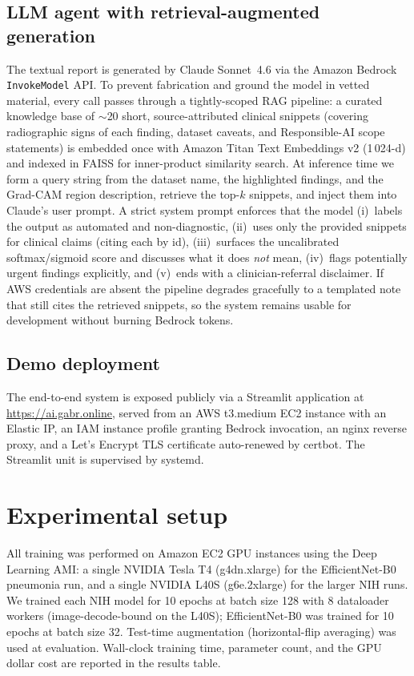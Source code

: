 \documentclass[10pt,journal,onecolumn]{IEEEtran}
\begin{document}
\subsection{LLM agent with retrieval-augmented generation}
The textual report is generated by Claude Sonnet~4.6 via the Amazon Bedrock \texttt{InvokeModel} API. To prevent fabrication and ground the model in vetted material, every call passes through a tightly-scoped RAG pipeline: a curated knowledge base of $\sim$20 short, source-attributed clinical snippets (covering radiographic signs of each finding, dataset caveats, and Responsible-AI scope statements) is embedded once with Amazon Titan Text Embeddings v2 (1\,024-d) and indexed in FAISS for inner-product similarity search. At inference time we form a query string from the dataset name, the highlighted findings, and the Grad-CAM region description, retrieve the top-$k$ snippets, and inject them into Claude's user prompt. A strict system prompt enforces that the model (i)~labels the output as automated and non-diagnostic, (ii)~uses only the provided snippets for clinical claims (citing each by id), (iii)~surfaces the uncalibrated softmax/sigmoid score and discusses what it does \emph{not} mean, (iv)~flags potentially urgent findings explicitly, and (v)~ends with a clinician-referral disclaimer. If AWS credentials are absent the pipeline degrades gracefully to a templated note that still cites the retrieved snippets, so the system remains usable for development without burning Bedrock tokens.

\subsection{Demo deployment}
The end-to-end system is exposed publicly via a Streamlit application at \url{https://ai.gabr.online}, served from an AWS t3.medium EC2 instance with an Elastic IP, an IAM instance profile granting Bedrock invocation, an nginx reverse proxy, and a Let's Encrypt TLS certificate auto-renewed by certbot. The Streamlit unit is supervised by systemd.

\section{Experimental setup}\label{sec:setup}

All training was performed on Amazon EC2 GPU instances using the Deep Learning AMI: a single NVIDIA Tesla T4 (g4dn.xlarge) for the EfficientNet-B0 pneumonia run, and a single NVIDIA L40S (g6e.2xlarge) for the larger NIH runs. We trained each NIH model for 10 epochs at batch size 128 with 8 dataloader workers (image-decode-bound on the L40S); EfficientNet-B0 was trained for 10 epochs at batch size 32. Test-time augmentation (horizontal-flip averaging) was used at evaluation. Wall-clock training time, parameter count, and the GPU dollar cost are reported in the results table.
\end{document}
